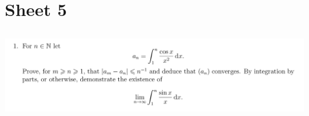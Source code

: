 \documentclass[12pt]{article}
\begin{document}





\section{Sheet 5}

\newpage
\subsection{}

\begin{mdframed}
\includegraphics[width=400pt]{img/analysis--oxford-M2-I-5-1.png}
\end{mdframed}
\end{document}
